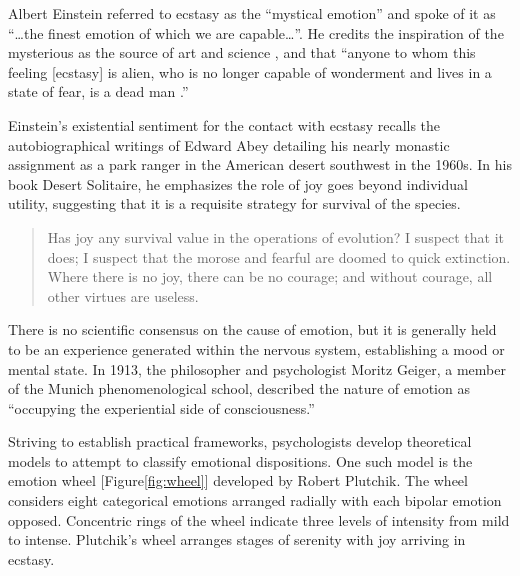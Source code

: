 \documentclass{UIdahoMastersThesis}
\begin{document}
Albert Einstein referred to ecstasy as the ``mystical emotion'' and spoke of it as \enquote{\ldots the finest emotion of which we are capable\ldots}. He credits the inspiration of the mysterious as the source of art and science , and that \enquote{anyone to whom this feeling [ecstasy] is alien, who is no longer capable of wonderment and lives in a state of fear, is a dead man \cite{einstein_science_1930}.}

Einstein's existential sentiment for the contact with ecstasy recalls the autobiographical writings of Edward Abey detailing his nearly monastic assignment as a park ranger in the American desert southwest in the 1960s. In his book Desert Solitaire, he emphasizes the role of joy goes beyond individual utility, suggesting that it is a requisite strategy for survival of the species. 


\begin{quote}
{Has joy any survival value in the operations of evolution? I suspect that it does; I suspect that the morose and fearful are doomed to quick extinction. Where there is no joy, there can be no courage; and without courage, all other virtues are useless.}
\end{quote}


There is no scientific consensus on the cause of emotion, but it is generally held to be an experience generated within the nervous system, establishing a mood or mental state. In 1913, the philosopher and psychologist Moritz Geiger, a member of the Munich phenomenological school, described the nature of emotion as ``occupying the experiential side of consciousness.\cite{mayer-gross_translation:_nodate}''   

Striving to establish practical frameworks, psychologists develop theoretical models to attempt to classify emotional dispositions. One such model is the emotion wheel [Figure\ref{fig:wheel}] developed by Robert Plutchik. The wheel considers eight categorical emotions arranged radially with each bipolar emotion opposed. Concentric rings of the wheel indicate three levels of intensity from mild to intense. Plutchik's wheel arranges stages of serenity with joy arriving in ecstasy.
\end{document}

